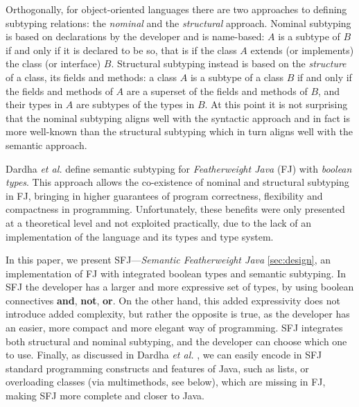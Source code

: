\documentclass[runningheads]{llncs}
\begin{document}
Orthogonally, for object-oriented languages there are two approaches to defining subtyping relations: the \emph{nominal} and the \emph{structural} approach.
Nominal subtyping is based on {declarations} by the developer and is {name}-based: $A$ is a subtype of $B$ if and only if it is declared to be so, that is if the class $A$ extends (or implements) the class (or interface) $B$.
Structural subtyping instead is based on the \emph{structure} of a class, its fields and methods: a class $A$ is a subtype of a class $B$ if and only if the fields and methods of $A$ are a superset of the fields and methods of $B$, and their types in $A$ are subtypes of the types in $B$.
At this point it is not surprising that the nominal subtyping aligns well with the syntactic approach and in fact is more well-known than the structural subtyping which in turn aligns well with the semantic approach.

Dardha \emph{et al.} \cite{Dardha2013,Dardha2017} define semantic subtyping for \emph{Featherweight Java} (FJ) \cite{featherweight} with \emph{boolean types}.
This approach allows the co-existence of nominal and structural subtyping in FJ, bringing in higher guarantees of program correctness, flexibility and compactness in programming.
Unfortunately, these benefits were only presented at a theoretical level and not exploited practically, due to the lack of an implementation of the language and its types and type system.

In this paper, we present SFJ---\emph{Semantic Featherweight Java} \autoref{sec:design}, an implementation of FJ with integrated boolean types and semantic subtyping.
In SFJ the developer has a larger and more expressive set of types, by using boolean connectives \textbf{and}, \textbf{not}, \textbf{or}. On the other hand, this added expressivity does not introduce added complexity, but rather the opposite is true, as the developer has an easier, more compact and more elegant way of programming.
SFJ integrates both structural and nominal subtyping, and the developer can choose which one to use.
Finally, as discussed in Dardha \emph{et al.} \cite[\S 8.4]{Dardha2017}, we can easily encode in SFJ standard programming constructs and features of Java, such as lists, or overloading classes (via multimethods, see below), which are missing in FJ, making SFJ more complete and closer to Java.
\end{document}
